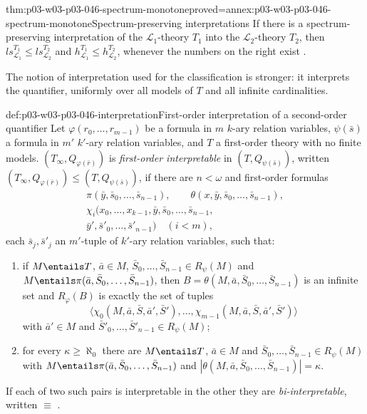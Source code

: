 \begin{hblemma}{thm:p03-w03-p03-046-spectrum-monotone}{proved=annex:p03-w03-p03-046-spectrum-monotone}{Spectrum-preserving interpretations}
If there is a spectrum-preserving interpretation of the
\(\mathscr L_1\)-theory \(T_1\) into the \(\mathscr L_2\)-theory \(T_2\),
then \(ls^{T_1}_{\mathscr L_1}\le ls^{T_2}_{\mathscr L_2}\) and
\(h^{T_1}_{\mathscr L_1}\le h^{T_2}_{\mathscr L_2}\), whenever the numbers
on the right exist \cite[p.~237, Lemma~1.4.3]{BaldwinShelah1985}.
\end{hblemma}

The notion of interpretation used for the classification is stronger: it
interprets the quantifier, uniformly over all models of \(T\) and all
infinite cardinalities.

\begin{hbdefinition}{def:p03-w03-p03-046-interpretation}{First-order interpretation of a second-order quantifier}
Let \(\varphi(r_0,\dots,r_{m-1})\) be a formula in \(m\) \(k\)-ary relation
variables, \(\psi(\bar s)\) a formula in \(m'\) \(k'\)-ary relation
variables, and \(T\) a first-order theory with no finite models.
\((T_\infty,Q_{\varphi(\bar r)})\) is \emph{first-order interpretable} in
\((T,Q_{\psi(\bar s)})\), written
\((T_\infty,Q_{\varphi(\bar r)})\le(T,Q_{\psi(\bar s)})\), if there are
\(n<\omega\) and first-order formulas
\begin{gather*}
\pi(\bar y,\bar s_0,\dots,\bar s_{n-1}),\qquad
\theta(x,\bar y,\bar s_0,\dots,\bar s_{n-1}),\\
\chi_i(x_0,\dots,x_{k-1},\bar y,\bar s_0,\dots,\bar s_{n-1},\\
\bar y',\bar s'_0,\dots,\bar s'_{n-1})\quad(i<m),
\end{gather*}
each \(\bar s_j,\bar s'_j\) an \(m'\)-tuple of \(k'\)-ary relation
variables, such that:
\begin{enumerate}
  \item if \(M\entails T\), \(\bar a\in M\), \(\bar S_0,\dots,\bar
        S_{n-1}\in R_\psi(M)\) and \(M\entails\pi(\bar a,\bar S_0,\dots,\bar
        S_{n-1})\), then \(B=\theta(M,\bar a,\bar S_0,\dots,\bar S_{n-1})\) is
        an infinite set and \(R_\varphi(B)\) is exactly the set of tuples
        \[\langle\chi_0(M,\bar a,\bar S,\bar a',\bar S'),\dots,
        \chi_{m-1}(M,\bar a,\bar S,\bar a',\bar S')\rangle\] with
        \(\bar a'\in M\) and \(\bar S'_0,\dots,\bar S'_{n-1}\in R_\psi(M)\);
  \item for every \(\kappa\ge\aleph_0\) there are \(M\entails T\),
        \(\bar a\in M\) and \(\bar S_0,\dots,\bar S_{n-1}\in R_\psi(M)\)
        with \(M\entails\pi(\bar a,\bar S_0,\dots,\bar S_{n-1})\) and
        \(|\theta(M,\bar a,\bar S_0,\dots,\bar S_{n-1})|=\kappa\).
\end{enumerate}
If each of two such pairs is interpretable in the other they are
\emph{bi-interpretable}, written \(\equiv\)
\cite[p.~241, Definition~2.1.3(a), (c)]{BaldwinShelah1985}.
\end{hbdefinition}

